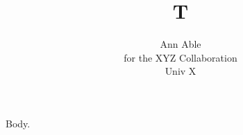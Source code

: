 \documentclass{article}
\begin{document}
\title{T}
\author{Ann Able \\ for the XYZ Collaboration \\ Univ X}
\maketitle
Body.
\end{document}
